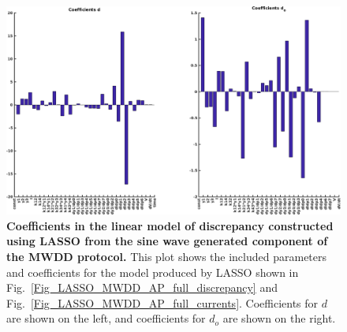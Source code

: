 \documentclass[11pt,a4paper,oneside]{article}
\begin{document}
\clearpage

\begin{figure}[t]
\begin{center}
\includegraphics[scale=0.42]{Figures/LASSO_MWDD_AP_full_coefficients.png}
\caption{\textbf{Coefficients in the linear model of discrepancy constructed using LASSO from the sine wave generated component of the MWDD protocol.} This plot shows the included parameters and coefficients for the model produced by LASSO shown in Fig.~\ref{Fig_LASSO_MWDD_AP_full_discrepancy} and Fig.~\ref{Fig_LASSO_MWDD_AP_full_currents}. Coefficients for $d$ are shown on the left, and coefficients for $d_o$ are shown on the right.} 
\label{Fig_LASSO_MWDD_AP_full_coefficients}
\end{center}
\end{figure}
\end{document}
